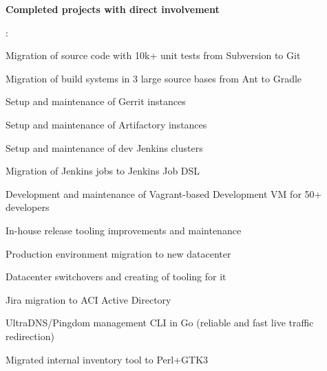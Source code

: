 \documentclass[letterpaper,11pt]{article}
\newcommand{\resumeItem}[2]{
  \item\small{
    \textbf{#1}{: #2 \vspace{-2pt}}
  }
}
\begin{document}
        \resumeItem{Completed projects with direct involvement}
          {
          
          Migration of source code with 10k+ unit tests from Subversion to Git
          
          Migration of build systems in 3 large source bases from Ant to Gradle

          Setup and maintenance of Gerrit instances
          
          Setup and maintenance of Artifactory instances
          
          Setup and maintenance of dev Jenkins clusters
          
          Migration of Jenkins jobs to Jenkins Job DSL
          
          Development and maintenance of Vagrant-based Development VM for 50+ developers
          
          In-house release tooling improvements and maintenance
          
          Production environment migration to new datacenter
          
          Datacenter switchovers and creating of tooling for it
          
          Jira migration to ACI Active Directory
          
          UltraDNS/Pingdom management CLI in Go (reliable and fast live traffic redirection)
          
          Migrated internal inventory tool to Perl+GTK3
         
		}
		
\end{document}
